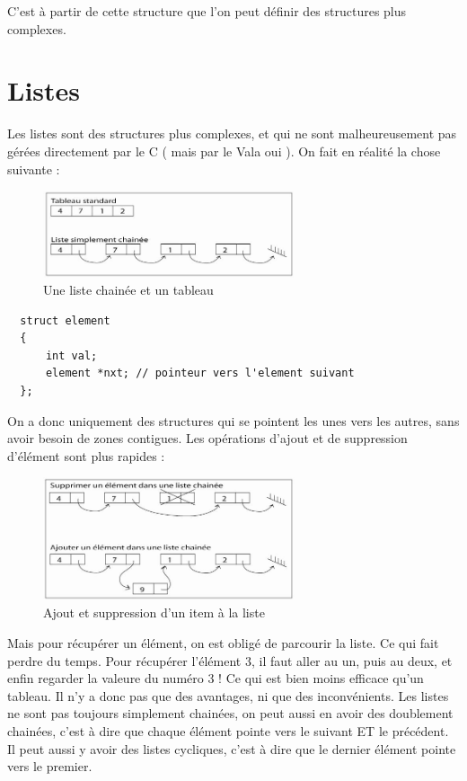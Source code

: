 C'est à partir de cette structure que l'on peut définir des structures plus complexes.

\section{Listes}
\label{DefListe}
Les listes sont des structures plus complexes, et qui ne sont malheureusement pas gérées directement par le C ( mais par le Vala oui ).
On fait en réalité la chose suivante : 
\begin{figure}[H]
	\begin{center}
	  \includegraphics[width=20em]{Annexes/Images/liste.jpg}
	\end{center}
	\caption{Une liste chainée et un tableau}
\end{figure}
\begin{lstlisting}
  struct element
  {
      int val;
      element *nxt; // pointeur vers l'element suivant
  };
\end{lstlisting}

On a donc uniquement des structures qui se pointent les unes vers les autres, sans avoir besoin de zones contigues. Les opérations d'ajout et de suppression d'élément sont plus rapides : 
\begin{figure}[H]
	\begin{center}
	  \includegraphics[width=20em]{Annexes/Images/liste_ajout.jpg}
	\end{center}
	\caption{Ajout et suppression d'un item à la liste}
\end{figure}

Mais pour récupérer un élément, on est obligé de parcourir la liste. Ce qui fait perdre du temps. Pour récupérer l'élément 3, il faut aller au un, puis au deux, et enfin regarder la valeure du numéro 3 !
Ce qui est bien moins efficace qu'un tableau. Il n'y a donc pas que des avantages, ni que des inconvénients. Les listes ne sont pas toujours simplement chainées, on peut aussi en avoir des doublement chainées, c'est à dire que chaque élément pointe vers le suivant ET le précédent. Il peut aussi y avoir des listes cycliques, c'est à dire que le dernier élément pointe vers le premier.

